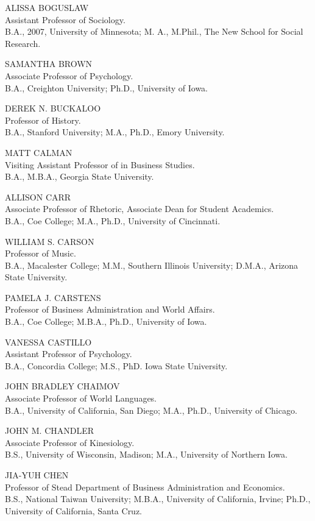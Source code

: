 \documentclass[
  letterpaper,
]{scrbook}
\begin{document}
ALISSA BOGUSLAW\\
Assistant Professor of Sociology.\\
B.A., 2007, University of Minnesota; M. A., M.Phil., The New School for
Social Research.

SAMANTHA BROWN\\
Associate Professor of Psychology.\\
B.A., Creighton University; Ph.D., University of Iowa.

DEREK N. BUCKALOO\\
Professor of History.\\
B.A., Stanford University; M.A., Ph.D., Emory University.

MATT CALMAN\\
Visiting Assistant Professor of in Business Studies.\\
B.A., M.B.A., Georgia State University.

ALLISON CARR\\
Associate Professor of Rhetoric, Associate Dean for Student Academics.\\
B.A., Coe College; M.A., Ph.D., University of Cincinnati.

WILLIAM S. CARSON\\
Professor of Music.\\
B.A., Macalester College; M.M., Southern Illinois University; D.M.A.,
Arizona State University.

PAMELA J. CARSTENS\\
Professor of Business Administration and World Affairs.\\
B.A., Coe College; M.B.A., Ph.D., University of Iowa.

VANESSA CASTILLO\\
Assistant Professor of Psychology.\\
B.A., Concordia College; M.S., PhD. Iowa State University.

JOHN BRADLEY CHAIMOV\\
Associate Professor of World Languages.\\
B.A., University of California, San Diego; M.A., Ph.D., University of
Chicago.

JOHN M. CHANDLER\\
Associate Professor of Kinesiology.\\
B.S., University of Wisconsin, Madison; M.A., University of Northern
Iowa.

JIA-YUH CHEN\\
Professor of Stead Department of Business Administration and
Economics.\\
B.S., National Taiwan University; M.B.A., University of California,
Irvine; Ph.D., University of California, Santa Cruz.
\end{document}
